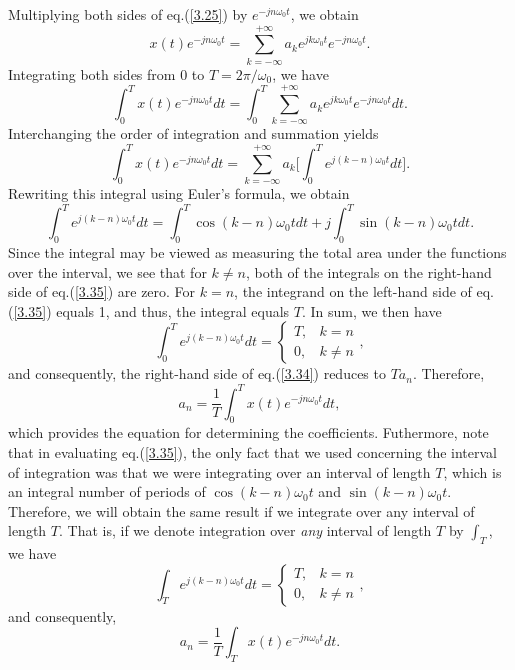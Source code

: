 \documentclass[a4paper,twoside]{book}
\begin{document}
Multiplying both sides of eq.\;(\ref{3.25}) by $e^{-jn\omega_0t}$, we obtain
\begin{equation}
    x(t)e^{-jn\omega_0t}=\sum_{k=-\infty}^{+\infty}a_ke^{jk\omega_0t}e^{-jn\omega_0t}.
    \label{3.33}
\end{equation}
Integrating both sides from 0 to $T=2\pi/\omega_0$, we have $$\int_0^Tx(t)e^{-jn\omega_0t} dt = \int_0^T\sum_{k=-\infty}^{+\infty}a_ke^{jk\omega_0t}e^{-jn\omega_0t} dt.$$ Interchanging the order of integration and summation yields
\begin{equation}
    \int_0^Tx(t)e^{-jn\omega_0t} dt = \sum_{k=-\infty}^{+\infty}a_k\bigg[\int_0^Te^{j(k-n)\omega_0t} dt\bigg].
    \label{3.34}
\end{equation}
Rewriting this integral using Euler's formula, we obtain
\begin{equation}
    \int_0^Te^{j(k-n)\omega_0t} dt = \int_0^T\cos(k-n)\omega_0t dt + j\int_0^T\sin(k-n)\omega_0t dt.
    \label{3.35}
\end{equation}
Since the integral may be viewed as measuring the total area under the functions over the interval, we see that for $k\ne n$, both of the integrals on the right-hand side of eq.\;(\ref{3.35}) are zero. For $k=n$, the integrand on the left-hand side of eq.\;(\ref{3.35}) equals 1, and thus, the integral equals $T$. In sum, we then have $$\left.\int_0^Te^{j(k-n)\omega_0t} dt=\left\{\begin{array}{ll}T,&k=n\\0,&k\neq n\end{array}\right.\right.,$$ and consequently, the right-hand side of eq.\;(\ref{3.34}) reduces to $Ta_n$. Therefore,
\begin{equation}
    a_n=\frac{1}{T}\int_0^Tx(t)e^{-jn\omega_0t} dt,
    \label{3.36}
\end{equation}
which provides the equation for determining the coefficients. Futhermore, note that in evaluating eq.\;(\ref{3.35}), the only fact that we used concerning the interval of integration was that we were integrating over an interval of length $T$, which is an integral number of periods of $\cos(k-n)\omega_0t$ and $\sin(k-n)\omega_0t$. Therefore, we will obtain the same result if we integrate over any interval of length $T$. That is, if we denote integration over \textit{any} interval of length $T$ by $\int_T$, we have $$\left.\int_Te^{j(k-n)\omega_0t} dt=\left\{\begin{array}{ll}T,&k=n\\0,&k\neq n\end{array}\right.\right.,$$ and consequently,
\begin{equation}
    a_n = \frac1T\int_Tx(t)e^{-jn\omega_0t} dt.
    \label{3.37}
\end{equation}
\end{document}
